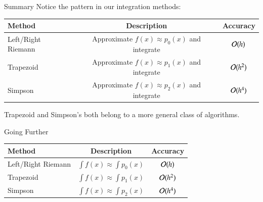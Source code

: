 \documentclass[10pt]{beamer}
\begin{document}
\begin{frame}{Summary}
Notice the pattern in our integration methods:



\begin{table}[h]
    \centering
    \begin{tabular}{lcc}
        \hline
        Method      & Description  & Accuracy\\
        \hline
        Left/Right Riemann & \parbox{5cm}{Approximate $f(x)\approx p_0(x)$\\  and integrate} & ${\mathcal{O}}(h)$ \\
        Trapezoid   & \parbox{5cm}{Approximate $f(x) \approx p_1(x)$\\  and integrate} & $\mO(h^2)$\\
        Simpson     & \parbox{5cm}{Approximate $f(x) \approx p_2(x)$\\  and integrate} & $\mO(h^4)$\\
        \hline
    \end{tabular}
    \label{tab:integration_methods}
\end{table}
\bigskip 

Trapezoid and Simpson's both belong to a more general class of algorithms.
%
%
%
%
\end{frame}
\begin{frame}{Going Further}
    \begin{table}[h]
    \centering
    \begin{tabular}{lcc}
        \hline
        Method      & Description  & Accuracy\\
        \hline
        Left/Right Riemann & $\int f(x)\approx \int p_0(x)$ & ${\mathcal{O}}(h)$ \\
        Trapezoid   & $\int f(x) \approx \int p_1(x)$ & $\mO(h^2)$\\
        Simpson     & $\int f(x) \approx \int p_2(x)$ & $\mO(h^4)$\\
        \hline
    \end{tabular}
\end{table}
\bigskip 
{}
\end{frame}
\end{document}
